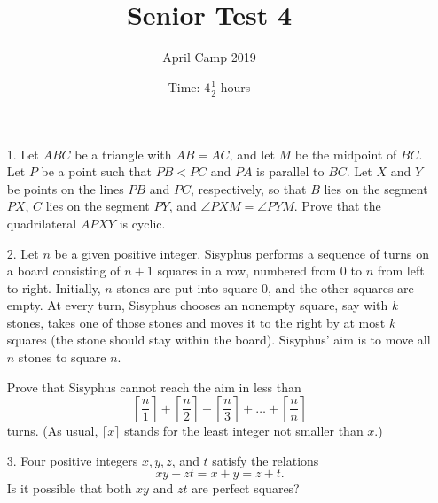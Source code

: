 \documentclass[a4paper, 12pt]{article}
\title{Senior Test 4}
\author{April Camp 2019}
\date{Time: $4 \frac{1}{2}$ hours}
\begin{document}
 \maketitle \vspace{24pt}

\begin{enumerate}

\item[1.]  Let $ABC$ be a triangle with $AB = AC$, and let $M$ be the midpoint of $BC$. Let $P$ be a point such that $PB < PC$ and $PA$ is parallel to $BC$. Let $X$ and $Y$ be points on the lines $PB$ and $PC$, respectively, so that $B$ lies on the segment $PX$, $C$ lies on the segment $PY$, and $\angle PXM = \angle PYM$. Prove that the quadrilateral $APXY$ is cyclic.

\vspace{24pt}


\item[2.]  Let $n$ be a given positive integer.  Sisyphus performs a sequence of turns on a board consisting of $n+1$ squares in a row, numbered from 0 to $n$ from left to right.  Initially, $n$ stones are put into square 0, and the other squares are empty. At every turn, Sisyphus chooses an nonempty square, say with $k$ stones, takes one of those stones and moves it to the right by at most $k$ squares (the stone should stay within the board). Sisyphus' aim is to move all $n$ stones to square $n$.

Prove that Sisyphus cannot reach the aim in less than
 $$\left\lceil \frac{n}{1} \right\rceil + \left\lceil \frac{n}{2} \right\rceil +\left\lceil \frac{n}{3} \right\rceil + \dots + \left\lceil \frac{n}{n} \right\rceil
$$
turns. (As usual, $\lceil x \rceil$ stands for the least integer not smaller than $x$.)


\vspace{24pt}
\item[3.]   Four positive integers $x, y, z$, and $t$ satisfy the relations
$$ xy - zt = x + y = z + t. $$
Is it possible that both $xy$ and $zt$ are perfect squares?




\end{enumerate}

\vfill

\centering

\vspace{12mm}
\end{document}
